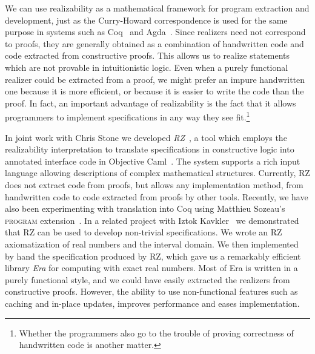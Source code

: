 \documentclass{entcs} \usepackage{prentcsmacro}
\begin{document}
We can use realizability as a mathematical framework for program
extraction and development, just as the Curry-Howard correspondence is
used for the same purpose in systems such as Coq~\cite{coq} and
Agda~\cite{agda}. Since realizers need not correspond to proofs, they
are generally obtained as a combination of handwritten code and code
extracted from constructive proofs. This allows us to realize
statements which are not provable in intuitionistic logic. Even when a
purely functional realizer could be extracted from a proof, we might
prefer an impure handwritten one because it is more efficient, or
because it is easier to write the code than the proof. In fact, an
important advantage of realizability is the fact that it allows
programmers to implement specifications in any way they see
fit.\footnote{Whether the programmers also go to the trouble of
  proving correctness of handwritten code is another matter.}

In joint work with Chris Stone we developed \emph{RZ}~\cite{RZ}, a
tool which employs the realizability interpretation to translate
specifications in constructive logic into annotated interface code in
Objective Caml~\cite{ocaml}. The system supports a rich input language
allowing descriptions of complex mathematical structures. Currently,
RZ does not extract code from proofs, but allows any implementation
method, from handwritten code to code extracted from proofs by other
tools. Recently, we have also been experimenting with translation into
Coq using Matthieu Sozeau's \textsc{program}
extension~\cite{program}. In a related project with Iztok
Kavkler~\cite{era} we demonstrated that RZ can be used to develop
non-trivial specifications. We wrote an RZ axiomatization of real
numbers and the interval domain. We then implemented by hand the
specification produced by RZ, which gave us a remarkably efficient
library \emph{Era} for computing with exact real numbers. Most of Era
is written in a purely functional style, and we could have easily
extracted the realizers from constructive proofs. However, the ability
to use non-functional features such as caching and in-place updates,
improves performance and eases implementation.
\end{document}
